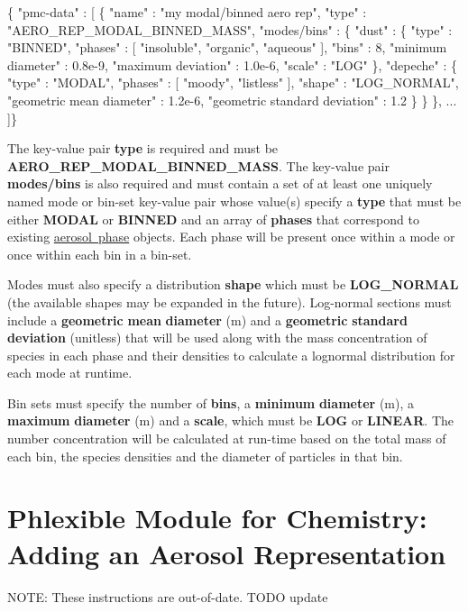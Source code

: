 \begin{DoxyCode}
\{ "pmc-data" : [
  \{
    "name" : "my modal/binned aero rep",
    "type" : "AERO\_REP\_MODAL\_BINNED\_MASS",
    "modes/bins" : 
    \{
      "dust" : 
      \{
        "type" : "BINNED",
        "phases" : [ "insoluble", "organic", "aqueous" ],
        "bins" : 8,
        "minimum diameter" : 0.8e-9,
        "maximum deviation" : 1.0e-6,
        "scale" : "LOG"
      \},
      "depeche" :
      \{
        "type" : "MODAL",
        "phases" : [ "moody", "listless" ],
        "shape" : "LOG\_NORMAL",
        "geometric mean diameter" : 1.2e-6,
        "geometric standard deviation" : 1.2
      \}
    \}
  \},
  ...
]\}
\end{DoxyCode}
 The key-\/value pair {\bfseries type} is required and must be {\bfseries A\+E\+R\+O\+\_\+\+R\+E\+P\+\_\+\+M\+O\+D\+A\+L\+\_\+\+B\+I\+N\+N\+E\+D\+\_\+\+M\+A\+SS}. The key-\/value pair {\bfseries modes/bins} is also required and must contain a set of at least one uniquely named mode or bin-\/set key-\/value pair whose value(s) specify a {\bfseries type} that must be either {\bfseries M\+O\+D\+AL} or {\bfseries B\+I\+N\+N\+ED} and an array of {\bfseries phases} that correspond to existing \mbox{\hyperlink{phlex_aero_phase}{aerosol phase}} objects. Each phase will be present once within a mode or once within each bin in a bin-\/set.

Modes must also specify a distribution {\bfseries shape} which must be {\bfseries L\+O\+G\+\_\+\+N\+O\+R\+M\+AL} (the available shapes may be expanded in the future). Log-\/normal sections must include a {\bfseries geometric} {\bfseries mean} {\bfseries diameter} (m) and a {\bfseries geometric} {\bfseries standard} {\bfseries deviation} (unitless) that will be used along with the mass concentration of species in each phase and their densities to calculate a lognormal distribution for each mode at runtime.

Bin sets must specify the number of {\bfseries bins}, a {\bfseries minimum} {\bfseries diameter} (m), a {\bfseries maximum} {\bfseries diameter} (m) and a {\bfseries scale}, which must be {\bfseries L\+OG} or {\bfseries L\+I\+N\+E\+AR}. The number concentration will be calculated at run-\/time based on the total mass of each bin, the species densities and the diameter of particles in that bin. \hypertarget{phlex_aero_rep_add}{}\section{Phlexible Module for Chemistry\+: Adding an Aerosol Representation}\label{phlex_aero_rep_add}
N\+O\+TE\+: These instructions are out-\/of-\/date. T\+O\+DO update

